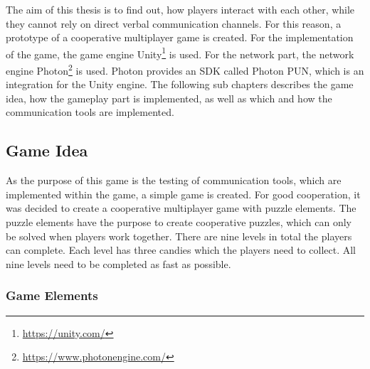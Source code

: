 The aim of this thesis is to find out, how players interact with each other, while they cannot rely on direct verbal communication channels.
For this reason, a prototype of a cooperative multiplayer game is created.
For the implementation of the game, the game engine Unity\footnote{\url{https://unity.com/}}
is used. 
For the network part, the network engine Photon\footnote{\url{https://www.photonengine.com/}} is used. Photon provides an SDK called Photon PUN, which is an integration for the Unity engine.
The following sub chapters describes the game idea, how the gameplay part is implemented, as well as which and how the communication tools are implemented.



\subsection{Game Idea}
\label{section:Game idea}
As the purpose of this game is the testing of communication tools, which are implemented within the game, a simple game is created.
For good cooperation, it was decided to create a cooperative multiplayer game with puzzle elements. The puzzle elements have the purpose to create cooperative puzzles, which can only be solved when players work together. There are nine levels in total the players can complete. Each level has three candies which the players need to collect. All nine levels need to be completed as fast as possible.

\subsubsection{Game Elements}
\label{section:Game elements}

